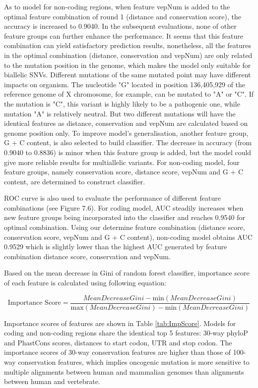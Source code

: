 \documentclass[a4paper,nohyper,nobib,openany,justified]{tufte-book}
\begin{document}
\begin{fullwidth}
As to model for non-coding regions, when feature vepNum is added to the optimal feature combination of round 1 (distance and conservation score), the accuracy is increased to 0.9040. In the subsequent evaluations, none of other feature groups can further enhance the performance. It seems that this feature combination can yield satisfactory prediction results, nonetheless, all the features in the optimal combination (distance, conservation and vepNum) are only related to the mutation position in the genome, which makes the model only suitable for biallelic SNVs. Different mutations of the same mutated point may have different impacts on organism. The nucleotide "G" located in position 136,405,929 of the reference genome of X chromosome, for example, can be mutated to "A" or "C". If the mutation is "C", this variant is highly likely to be a pathogenic one, while mutation "A" is relatively neutral. But two different mutations will have the identical features as distance, conservation and vepNum are calculated based on genome position only. To improve model's generalisation, another feature group, G + C content, is also selected to build classifier. The decrease in accuracy (from 0.9040 to 0.8836) is minor when this feature group is added, but the model could give more reliable results for multiallelic variants. For non-coding model, four feature groups, namely conservation score, distance score, vepNum and G + C content, are determined to construct classifier.

ROC curve is also used to evaluate the performance of different feature combinations (see Figure 7.6). For coding model, AUC steadily increases when new feature groups being incorporated into the classifier and reaches 0.9540 for optimal combination. Using our determine feature combination (distance score, conservation score, vepNum and G + C content), non-coding model obtains AUC 0.9529 which is slightly lower than the highest AUC generated by feature combination distance score, conservation and vepNum.

Based on the mean decrease in Gini of random forest classifier, importance score of each feature is calculated using following equation:

\begin{equation}
    \text{Importance Score} = \frac{MeanDecreaseGini - \text{min}(MeanDecreaseGini)}{\text{max}(MeanDecreaseGini) - \text{min}(MeanDecreaseGini)} \nonumber
\end{equation}

Importance scores of features are shown in Table \ref{tab:ImpScore}. Models for coding and non-coding regions share the identical top 5 features: 30-way phyloP and PhastCons scores, distances to start codon, UTR and stop codon. The importance scores of 30-way conservation features are higher than those of 100-way conservation features, which implies oncogenic mutation is more sensitive to multiple alignments between human and mammalian genomes than alignments between human and vertebrate.


\end{fullwidth}
\end{document}
